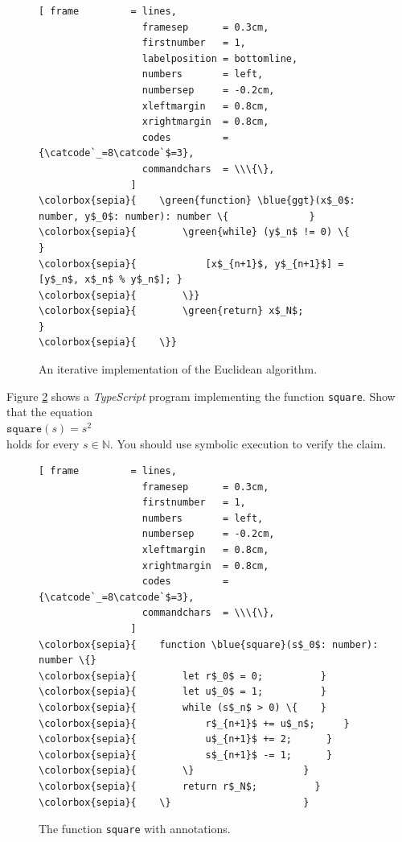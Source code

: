 \begin{figure}[!ht]
\centering
\begin{Verbatim}[ frame         = lines, 
                  framesep      = 0.3cm, 
                  firstnumber   = 1,
                  labelposition = bottomline,
                  numbers       = left,
                  numbersep     = -0.2cm,
                  xleftmargin   = 0.8cm,
                  xrightmargin  = 0.8cm,
                  codes         = {\catcode`_=8\catcode`$=3},
                  commandchars  = \\\{\},
                ]
\colorbox{sepia}{    \green{function} \blue{ggt}(x$_0$: number, y$_0$: number): number \{              }
\colorbox{sepia}{        \green{while} (y$_n$ != 0) \{                    }
\colorbox{sepia}{            [x$_{n+1}$, y$_{n+1}$] = [y$_n$, x$_n$ % y$_n$]; }
\colorbox{sepia}{        \}}
\colorbox{sepia}{        \green{return} x$_N$;                            }
\colorbox{sepia}{    \}}
\end{Verbatim}
\vspace*{-0.3cm}
\caption{An iterative implementation of the Euclidean algorithm.}
\label{fig:gcd.stlx}
\end{figure}
\pagebreak
\exerciseEng
Figure \ref{fig:square-iterative} shows a \textsl{TypeScript} program implementing the function \texttt{square}.  Show that the equation
\\[0.2cm]
\hspace*{1.3cm}
$\mathtt{square}(s) = s^2$
\\[0.2cm]
holds for every $s \in \mathbb{N}$.  You should use symbolic execution to verify the claim.
\eox

\begin{figure}[!ht]
\centering
\begin{Verbatim}[ frame         = lines, 
                  framesep      = 0.3cm, 
                  firstnumber   = 1,
                  numbers       = left,
                  numbersep     = -0.2cm,
                  xleftmargin   = 0.8cm,
                  xrightmargin  = 0.8cm,
                  codes         = {\catcode`_=8\catcode`$=3},
                  commandchars  = \\\{\},
                ]
\colorbox{sepia}{    function \blue{square}(s$_0$: number): number \{}
\colorbox{sepia}{        let r$_0$ = 0;          }
\colorbox{sepia}{        let u$_0$ = 1;          }
\colorbox{sepia}{        while (s$_n$ > 0) \{    }
\colorbox{sepia}{            r$_{n+1}$ += u$_n$;     }
\colorbox{sepia}{            u$_{n+1}$ += 2;      }
\colorbox{sepia}{            s$_{n+1}$ -= 1;      }
\colorbox{sepia}{        \}                   }
\colorbox{sepia}{        return r$_N$;          }
\colorbox{sepia}{    \}                       }
\end{Verbatim}
\vspace*{-0.3cm}
\caption{The function \texttt{square} with annotations.}
\label{fig:square-iterative}
\end{figure}


